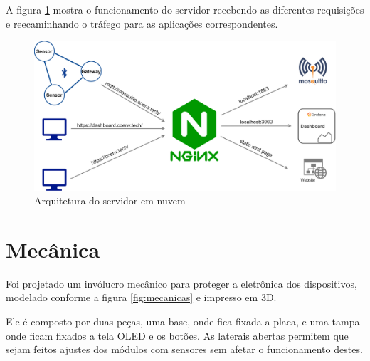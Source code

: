 \documentclass[../monografia.tex]{subfiles}
\begin{document}
A figura \ref{fig:cloud-server-architecture} mostra o funcionamento do servidor recebendo as diferentes requisições e reecaminhando o tráfego para as aplicações correspondentes.

\begin{figure}[h!]
	\centering
	\includegraphics[scale=0.16]{server-architecture.png}
	\caption{Arquitetura do servidor em nuvem}
	\label{fig:cloud-server-architecture}
\end{figure}

\section{Mecânica}

Foi projetado um invólucro mecânico para proteger a eletrônica dos dispositivos, modelado conforme a figura \ref{fig:mecanicas} e impresso em 3D. 

Ele é composto por duas peças, uma base, onde fica fixada a placa, e uma tampa onde ficam fixados a tela OLED e os botões. As laterais abertas permitem que sejam feitos ajustes dos módulos com sensores sem afetar o funcionamento destes. 
\end{document}
